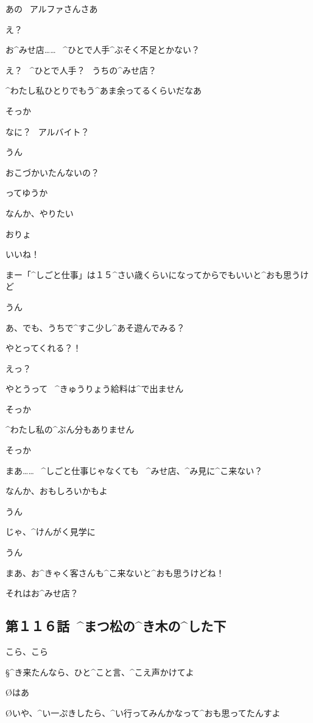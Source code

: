 \page
\M あの
\ アルファさんさあ

\A え？

\M お^{みせ}{店}……
\ ^{ひとで}{人手}^{ぶそく}{不足}とかない？

\A え？
\ ^{ひとで}{人手}？
\ うちの^{みせ}{店}？

\A ^{わたし}{私}ひとりでもう^{あま}{余}ってるくらいだなあ

\M そっか

\page
\A なに？
\ アルバイト？

\M うん

\A おこづかいたんないの？

\M ってゆうか

\M なんか、やりたい

\A おりょ

\A いいね！

\A まー「^{しごと}{仕事}」は１５^{さい}{歳}くらいになってからでもいいと^{おも}{思}うけど

\page
\M うん

\A あ、でも、うちで^{すこ}{少}し^{あそ}{遊}んでみる？

\M やとってくれる？！

\A えっ？

\A やとうって
\ ^{きゅうりょう}{給料}は^{で}{出}ません

\M そっか

\A ^{わたし}{私}の^{ぶん}{分}もありません

\M そっか

\page
\A まあ……
\ ^{しごと}{仕事}じゃなくても
\ ^{みせ}{店}、^{み}{見}に^{こ}{来}ない？

\A なんか、おもしろいかもよ

\M うん

\A じゃ、^{けんがく}{見学}に

\M うん

\page
\A まあ、お^{きゃく}{客}さんも^{こ}{来}ないと^{おも}{思}うけどね！

\M それはお^{みせ}{店}？


\subsection{第１１６話\ ^{まつ}{松}の^{き}{木}の^{した}{下}}

\page[79]
\A こら、こら

\page
\S ^{き}{来}たんなら、ひと^{こと}{言}、^{こえ}{声}かけてよ

\O はあ

\O いや、^{い}{一}ぷきしたら、^{い}{行}ってみんかなって^{おも}{思}ってたんすよ

